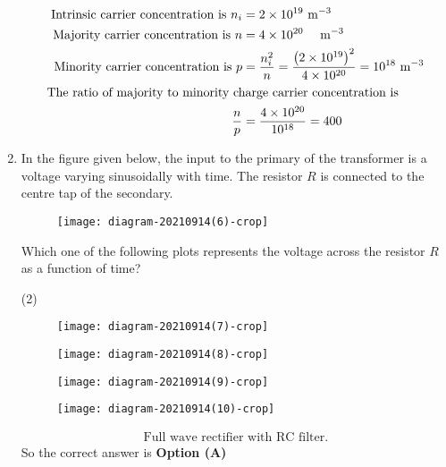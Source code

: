 \begin{enumerate}
	\begin{answer}
		\begin{align*}
		\text{	Intrinsic carrier concentration is }n_{i}&=2 \times 10^{19} \mathrm{~m}^{-3}\\
		\text{Majority carrier concentration is }n&=4 \times 10^{20} \quad \mathrm{~m}^{-3}\\
		\text{Minority carrier concentration is }p&=\frac{n_{i}^{2}}{n}=\frac{\left(2 \times 10^{19}\right)^{2}}{4 \times 10^{20}}=10^{18} \mathrm{~m}^{-3}\\
		\intertext{The ratio of majority to minority charge carrier concentration is }\frac{n}{p}&=\frac{4 \times 10^{20}}{10^{18}}=400
		\end{align*}
	\end{answer}
	\item In the figure given below, the input to the primary of the transformer is a voltage varying sinusoidally with time. The resistor $R$ is connected to the centre tap of the secondary.\\
	\begin{figure}[H]
		\centering
		\texttt{[image: diagram-20210914(6)-crop]}
	\end{figure}
	Which one of the following plots represents the voltage across the resistor $R$ as a function of time?
	{}
	\begin{tasks}(2)
		\task[\textbf{A.}] \begin{figure}[H]
			\centering
			\texttt{[image: diagram-20210914(7)-crop]}
		\end{figure}
		\task[\textbf{B.}] \begin{figure}[H]
			\centering
			\texttt{[image: diagram-20210914(8)-crop]}
		\end{figure}
		\task[\textbf{C.}] \begin{figure}[H]
			\centering
			\texttt{[image: diagram-20210914(9)-crop]}
		\end{figure}
		\task[\textbf{D.}] 
		\begin{figure}[H]
			\centering
			\texttt{[image: diagram-20210914(10)-crop]}
		\end{figure}
	\end{tasks}
	\begin{answer}
		\begin{align*}
		\text{Full wave rectifier with RC filter.}
		\end{align*}
		So the correct answer is \textbf{Option (A)}

\end{answer}
\end{enumerate}
